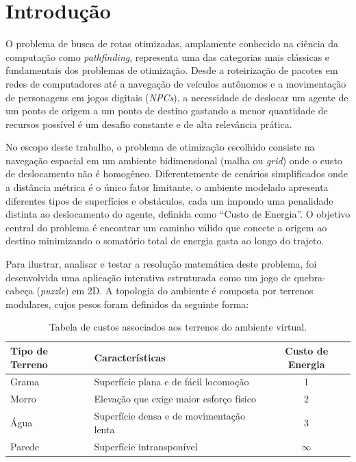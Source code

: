 \chapter{Introdução}
\label{chap:introducao}

O problema de busca de rotas otimizadas, amplamente conhecido na ciência da computação como \textit{pathfinding}, representa uma das categorias mais clássicas e fundamentais dos problemas de otimização. Desde a roteirização de pacotes em redes de computadores até a navegação de veículos autônomos e a movimentação de personagens em jogos digitais (\textit{NPCs}), a necessidade de deslocar um agente de um ponto de origem a um ponto de destino gastando a menor quantidade de recursos possível é um desafio constante e de alta relevância prática.

No escopo deste trabalho, o problema de otimização escolhido consiste na navegação espacial em um ambiente bidimensional (malha ou \textit{grid}) onde o custo de deslocamento não é homogêneo. Diferentemente de cenários simplificados onde a distância métrica é o único fator limitante, o ambiente modelado apresenta diferentes tipos de superfícies e obstáculos, cada um impondo uma penalidade distinta ao deslocamento do agente, definida como ``Custo de Energia''. O objetivo central do problema é encontrar um caminho válido que conecte a origem ao destino minimizando o somatório total de energia gasta ao longo do trajeto.

Para ilustrar, analisar e testar a resolução matemática deste problema, foi desenvolvida uma aplicação interativa estruturada como um jogo de quebra-cabeça (\textit{puzzle}) em 2D. A topologia do ambiente é composta por terrenos modulares, cujos pesos foram definidos da seguinte forma:

\vspace{0.5cm}
\begin{table}[h]
\centering
\begin{tabular}{llc}
\toprule
\textbf{Tipo de Terreno} & \textbf{Características} & \textbf{Custo de Energia} \\
\midrule
Grama & Superfície plana e de fácil locomoção & 1 \\
Morro & Elevação que exige maior esforço físico & 2 \\
Água & Superfície densa e de movimentação lenta & 3 \\
Parede & Superfície intransponível & $\infty$ \\
\bottomrule
\end{tabular}
\caption{Tabela de custos associados aos terrenos do ambiente virtual.}
\label{tab:custo_enegia}
\end{table}
\vspace{0.5cm}

